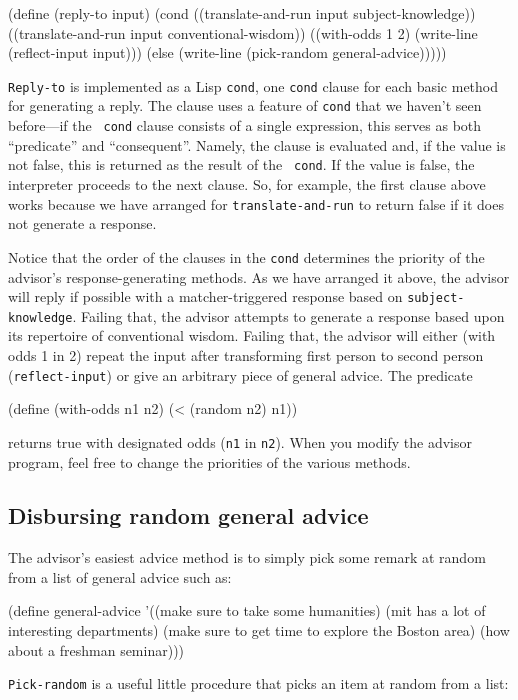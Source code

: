 \beginlisp
(define (reply-to input)
  (cond
   ((translate-and-run input subject-knowledge))
   ((translate-and-run input conventional-wisdom))
   ((with-odds 1 2)
    (write-line (reflect-input input)))
   (else
    (write-line (pick-random general-advice)))))
\endlisp

{\tt Reply-to} is implemented as a Lisp {\tt cond}, one {\tt cond}
clause for each basic method for generating a reply.  The clause uses
a feature of {\tt cond} that we haven't seen before---if the {\tt
cond} clause consists of a single expression, this serves as both
``predicate'' and ``consequent''.  Namely, the clause is evaluated and, if
the value is not false, this is returned as the result of the {\tt
cond}.  If the value is false, the interpreter proceeds to the next
clause.  So, for example, the first clause above works because we have
arranged for {\tt translate-and-run} to return false if it does not
generate a response.

Notice that the order of the clauses in the {\tt cond} determines the
priority of the advisor's response-generating methods.  As we have
arranged it above, the advisor will reply if possible with a
matcher-triggered response based on {\tt subject-knowledge}.  Failing
that, the advisor attempts to generate a response based upon its
repertoire of conventional wisdom.  Failing that, the advisor will
either (with odds 1 in 2) repeat the input after transforming first
person to second person ({\tt reflect-input}) or give an arbitrary
piece of general advice.  The predicate

\beginlisp
(define (with-odds n1 n2) (< (random n2) n1))
\endlisp

\noindent
returns true with designated odds ({\tt n1} in {\tt n2}).
When you modify the advisor program, feel free to change the priorities
of the various methods.

\subsection{Disbursing random general advice}

The advisor's easiest advice method is to simply pick some remark at
random from a list of general advice such as:

\beginlisp
(define general-advice
  '((make sure to take some humanities)
    (mit has a lot of interesting departments)
    (make sure to get time to explore the Boston area)
    (how about a freshman seminar)))
\endlisp

\noindent
{\tt Pick-random} is a useful little procedure that picks an item at
random from a list:

